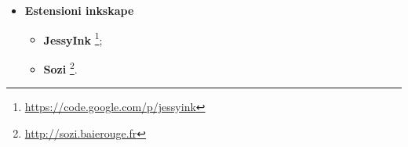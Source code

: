 \begin{itemize}
  	\begin{itemize}
  		\item \textbf{Imprys lite};
  		\item \textbf{FlowBoard}
  		\footnote{\url{https://flowvella.com}};
  		\item \textbf{Haiku Deck}
  		\footnote{\url{https://www.haikudeck.com}}.
  	\end{itemize}
  	  	\item \textbf{Estensioni inkskape}
  	\begin{itemize}
  		\item \textbf{JessyInk}
  		\footnote{\url{https://code.google.com/p/jessyink}};
  		\item \textbf{Sozi}
  		\footnote{\url{http://sozi.baierouge.fr}}.
  	\end{itemize}
\end{itemize}
